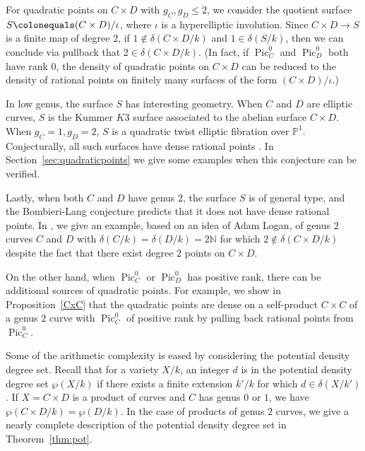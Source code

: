 \documentclass[a4paper,11pt]{amsart}
\theoremstyle{plain}
\theoremstyle{remark}
\newcommand{\nn}{\mathbb{N}}
\newcommand{\Pic}{\operatorname{Pic}}
\newcommand{\dendegs}{\delta}
\newcommand{\potdendegs}{\wp}
\newcommand{\defi}[1]{\textsf{#1}} %
\begin{document}
For quadratic points on \(C \times D\) with \(g_C, g_D \leq 2\), 
we consider the quotient surface \(S \colonequals (C \times D)/\iota\), where \(\iota\) is a hyperelliptic involution.  
Since \(C \times D \to S\) is a finite map of degree \(2\), if \(1 \not\in \dendegs(C \times D/k)\) and \(1 \in \dendegs(S/k)\), then we can conclude via pullback that \(2 \in \dendegs(C \times D/k)\).
(In fact, if $\Pic^0_C$ and $\Pic_D^0$ both have rank $0$, the density of quadratic points on \(C \times D\) can be reduced to the density of rational points on finitely many surfaces of the form \((C \times D)/\iota\).)

In low genus, the surface \(S\) has interesting geometry.
When \(C\) and \(D\) are elliptic curves, \(S\) is the Kummer $K3$ surface associated to the abelian surface $C\times D$.
When $g_C=1, g_D=2$, \(S\) is a quadratic twist elliptic fibration over $\mathbb{P}^1$. 
Conjecturally, all such surfaces have dense rational points \cite[Conjecture 1.1]{DeJard}. 
In Section~\ref{sec:quadraticpoints} we give some examples when this conjecture can be verified.

Lastly, when both \(C\) and \(D\) have genus $2$, the surface \(S\) is of general type, and the Bombieri-Lang conjecture predicts that it does not have dense rational points. 
In , we give an example, based on an idea of Adam Logan, of genus \(2\) curves \(C\) and \(D\) with \(\dendegs(C/k) = \dendegs(D/k) = 2 \nn\) for which \(2 \notin \dendegs(C \times D/k)\) despite the fact that there exist degree \(2\) points on \(C \times D\). 

On the other hand, when \(\Pic^0_C\) or \(\Pic^0_D\) has positive rank, there can be additional sources of quadratic points.  For example, we show in Proposition~\ref{CxC} that the quadratic points are dense on a self-product $C\times C$ of a genus $2$ curve with $\Pic_C^0$ of positive rank by pulling back rational points from $\Pic_C^0$.

Some of the arithmetic complexity is eased by considering the \defi{potential density degree set}.  Recall that for a variety \(X/k\), an integer \(d\) is in the potential density degree set \(\potdendegs(X/k)\) if there exists a finite extension \(k'/k\) for which \(d \in \dendegs(X/k')\).  If \(X = C \times D\) is a product of curves and \(C\) has genus \(0\) or \(1\), we have \(\potdendegs(C \times D/k) = \potdendegs(D/k)\). In the case of products of genus \(2\) curves, we give a nearly complete description of the potential density degree set in Theorem~\ref{thm:pot}.
\end{document}
